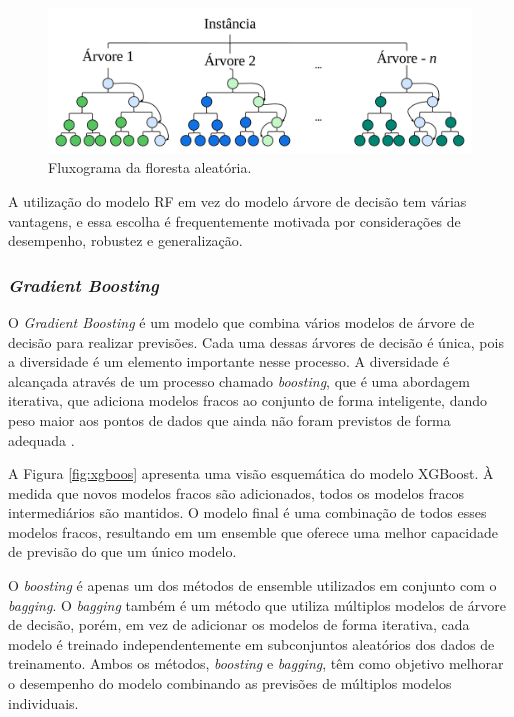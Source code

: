  \begin{figure}[!htb]
 	\centering
 	\caption{Fluxograma da floresta aleatória.}
 	\label{fig:rf}
 	\includegraphics[width=\linewidth]{Modelos/Figuras/RF.pdf}
 \end{figure}
 
A utilização do modelo RF em vez do modelo árvore de decisão tem várias vantagens, e essa escolha é frequentemente motivada por considerações de desempenho, robustez e generalização.
 
 \subsubsection{\textit{Gradient Boosting}}\label{subsubsec:lgbxgb}
 
 O \textit{Gradient Boosting} é um modelo que combina vários modelos de árvore de decisão para realizar previsões. Cada uma dessas árvores de decisão é única, pois a diversidade é um elemento importante nesse processo. A diversidade é alcançada através de um processo chamado \textit{boosting}, que é uma abordagem iterativa, que adiciona modelos fracos ao conjunto de forma inteligente, dando peso maior aos pontos de dados que ainda não foram previstos de forma adequada \cite{BUEECHI2023109596}. 
 
A Figura \ref{fig:xgboos} apresenta uma visão esquemática do modelo XGBoost. À medida que novos modelos fracos são adicionados, todos os modelos fracos intermediários são mantidos. O modelo final é uma combinação de todos esses modelos fracos, resultando em um ensemble que oferece uma melhor capacidade de previsão do que um único modelo.
 
 O \textit{boosting} é apenas um dos métodos de ensemble utilizados em conjunto com o \textit{bagging}. O \textit{bagging} também é um método que utiliza múltiplos modelos de árvore de decisão, porém, em vez de adicionar os modelos de forma iterativa, cada modelo é treinado independentemente em subconjuntos aleatórios dos dados de treinamento. Ambos os métodos, \textit{boosting} e \textit{bagging}, têm como objetivo melhorar o desempenho do modelo combinando as previsões de múltiplos modelos individuais.
 
